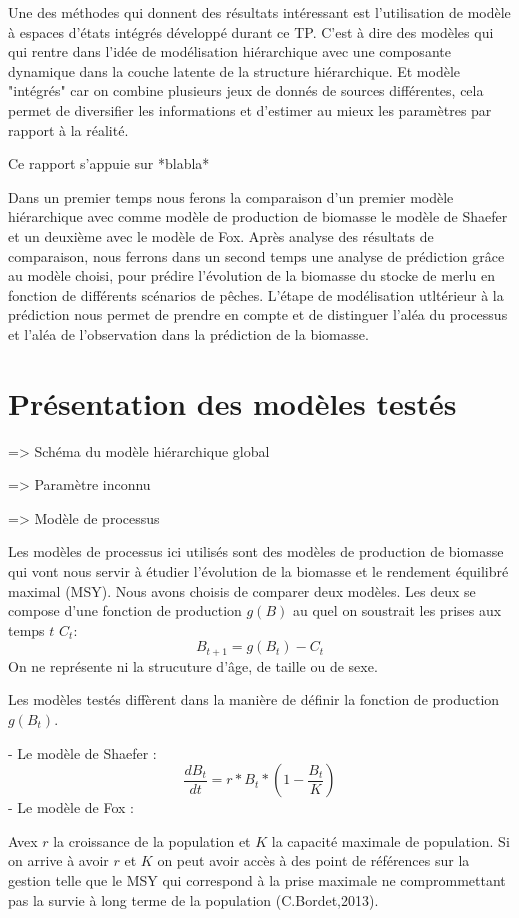 \documentclass[a4paper,11pt,twoside,openany]{report}
\theoremstyle{plain}
\theoremstyle{definition}
\theoremstyle{remark}
\begin{document}
Une des méthodes qui donnent des résultats intéressant est l'utilisation de modèle à espaces d'états 
intégrés développé durant ce TP. C'est à dire des modèles qui qui rentre dans l'idée de modélisation 
hiérarchique avec une composante dynamique dans la couche latente de la structure hiérarchique. 
Et modèle "intégrés" car on combine plusieurs jeux de donnés de sources différentes, 
cela permet de diversifier les informations et d'estimer au mieux les paramètres par rapport à la réalité.

Ce rapport s'appuie sur *blabla*

Dans un premier temps nous ferons la comparaison d'un premier modèle hiérarchique avec comme modèle 
de production de biomasse le modèle de Shaefer et un deuxième avec le modèle de Fox. Après analyse des 
résultats de comparaison, nous ferrons dans un second temps une analyse de prédiction grâce au modèle 
choisi, pour prédire l'évolution de la biomasse du stocke de merlu en fonction de différents scénarios 
de pêches. L'étape de modélisation utltérieur à la prédiction nous permet de prendre en compte et de 
distinguer l'aléa du processus et l'aléa de l'observation dans la prédiction de la biomasse.


\section*{Présentation des modèles testés}

=> Schéma du modèle hiérarchique global 

=> Paramètre inconnu


=> Modèle de processus 

Les modèles de processus ici utilisés sont des modèles de production de biomasse qui vont 
nous servir à étudier l'évolution de la biomasse et le rendement équilibré maximal (MSY). 
Nous avons choisis de comparer deux modèles. Les deux se compose d'une fonction de production $g(B)$ 
au quel on soustrait les prises aux temps $t$ $C_t$:
$$B_{t+1} =  g(B_t)-C_t$$
On ne représente ni la strucuture d'âge, de taille ou de sexe.

Les modèles testés diffèrent dans la manière de définir la fonction de production $g(B_t)$. 

- Le modèle de Shaefer :
$$\dfrac{dB_t}{dt}= r*B_t*(1 - \dfrac{B_t}{K}) $$
- Le modèle de Fox :

Avex $r$ la croissance de la population et $K$ la capacité maximale de population. Si on arrive à avoir $r$ 
et $K$ on peut avoir accès à des point de références sur la gestion telle que le MSY qui correspond à la 
prise maximale ne comprommettant pas la survie à long terme de la population (C.Bordet,2013).
\end{document}
